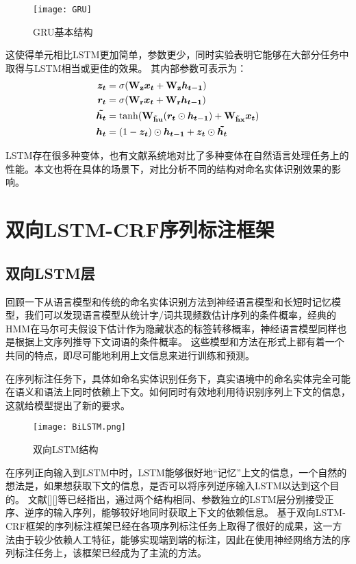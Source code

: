 \begin{figure}[!htpb]
    \centering
    \texttt{[image: GRU]}
    \caption{GRU基本结构}
    \label{fig:GRU}
\end{figure}
这使得单元相比LSTM更加简单，参数更少，同时实验表明它能够在大部分任务中取得与LSTM相当或更佳的效果。
其内部参数可表示为：
\begin{align}
    \boldsymbol{z_t} &= \sigma(\boldsymbol{\mathbf{W_{z}}}\boldsymbol{x_t} + \boldsymbol{\mathbf{W_{z}}}\boldsymbol{h_{t-1}})\\
    \boldsymbol{r_t} &= \sigma(\boldsymbol{\mathbf{W_{r}}}\boldsymbol{x_t} + \boldsymbol{\mathbf{W_{r}}}\boldsymbol{h_{t-1}})\\
    \boldsymbol{\tilde{h_t}} &= \tanh(\boldsymbol{\mathbf{W_{\tilde{h}u}}}(\boldsymbol{r_t} \odot \boldsymbol{h_{t-1}}) + \boldsymbol{\mathbf{W_{\tilde{h}x}}}\boldsymbol{x_t})\\
    \boldsymbol{h_t} &= (1 - \boldsymbol{z_t}) \odot \boldsymbol{h_{t-1}} + \boldsymbol{z_t} \odot \boldsymbol{\tilde{h_t}}
\end{align}

LSTM存在很多种变体，也有文献系统地对比了多种变体在自然语言处理任务上的性能。本文也将在具体的场景下，对比分析不同的结构对命名实体识别效果的影响。

\section{双向LSTM-CRF序列标注框架}
\subsection{双向LSTM层}
回顾一下从语言模型和传统的命名实体识别方法到神经语言模型和长短时记忆模型，我们可以发现语言模型从统计字/词共现频数估计序列的条件概率，经典的HMM在马尔可夫假设下估计作为隐藏状态的标签转移概率，神经语言模型同样也是根据上文序列推导下文词语的条件概率。
这些模型和方法在形式上都有着一个共同的特点，即尽可能地利用上文信息来进行训练和预测。

在序列标注任务下，具体如命名实体识别任务下，真实语境中的命名实体完全可能在语义和语法上同时依赖上下文。如何同时有效地利用待识别序列上下文的信息，这就给模型提出了新的要求。
\begin{figure}[!htbp]
    \centering
    \texttt{[image: BiLSTM.png]}
    \caption{双向LSTM结构}
    \label{fig:BiLSTM}
\end{figure}

在序列正向输入到LSTM中时，LSTM能够很好地“记忆”上文的信息，一个自然的想法是，如果想获取下文的信息，是否可以将序列逆序输入LSTM以达到这个目的。
文献[][]等已经指出，通过两个结构相同、参数独立的LSTM层分别接受正序、逆序的输入序列，能够较好地同时获取上下文的依赖信息。
基于双向LSTM-CRF框架的序列标注框架已经在各项序列标注任务上取得了很好的成果，这一方法由于较少依赖人工特征，能够实现端到端的标注，因此在使用神经网络方法的序列标注任务上，该框架已经成为了主流的方法。

